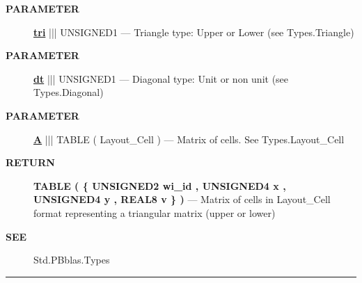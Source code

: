 \par
\begin{description}
\item [\colorbox{tagtype}{\color{white} \textbf{\textsf{PARAMETER}}}] \textbf{\underline{tri}} ||| UNSIGNED1 --- Triangle type: Upper or Lower (see Types.Triangle)
\item [\colorbox{tagtype}{\color{white} \textbf{\textsf{PARAMETER}}}] \textbf{\underline{dt}} ||| UNSIGNED1 --- Diagonal type: Unit or non unit (see Types.Diagonal)
\item [\colorbox{tagtype}{\color{white} \textbf{\textsf{PARAMETER}}}] \textbf{\underline{A}} ||| TABLE ( Layout\_Cell ) --- Matrix of cells. See Types.Layout\_Cell
\end{description}







\par
\begin{description}
\item [\colorbox{tagtype}{\color{white} \textbf{\textsf{RETURN}}}] \textbf{TABLE ( \{ UNSIGNED2 wi\_id , UNSIGNED4 x , UNSIGNED4 y , REAL8 v \} )} --- Matrix of cells in Layout\_Cell format representing a triangular matrix (upper or lower)
\end{description}







\par
\begin{description}
\item [\colorbox{tagtype}{\color{white} \textbf{\textsf{SEE}}}] Std.PBblas.Types
\end{description}



\rule{\linewidth}{0.5pt}
